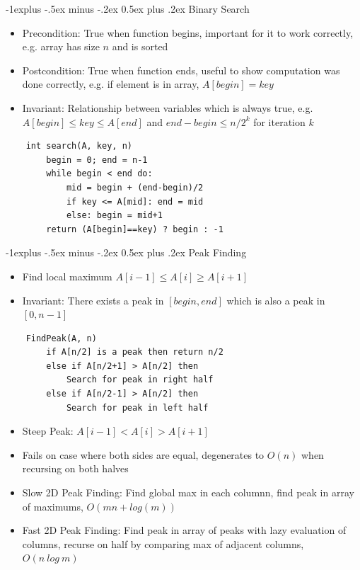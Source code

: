 \documentclass[10pt, landscape]{article}
\makeatletter
\renewcommand{\section}{\@startsection{section}{1}{0mm}%
                                {-1ex plus -.5ex minus -.2ex}%
                                {0.5ex plus .2ex}%
                                {\normalfont\large\bfseries}}
\renewcommand{\section}{\@startsection{section}{2}{0mm}%
                                {-1explus -.5ex minus -.2ex}%
                                {0.5ex plus .2ex}%
                                {\normalfont\normalsize\bfseries}}
\makeatother
\begin{document}
\begin{multicols*}{4}
\section{Binary Search}
\begin{itemize}
    \item Precondition: True when function begins, important for it to work correctly, e.g. array has size $n$ and is sorted
    \item Postcondition: True when function ends, useful to show computation was done correctly, e.g. if element is in array, $A[begin]=key$
    \item Invariant: Relationship between variables which is always true, e.g. $A[begin] \leq key \leq A[end]$ and $end-begin \leq n/2^k$ for iteration $k$
\end{itemize}
\begin{verbatim}
    int search(A, key, n)
        begin = 0; end = n-1
        while begin < end do:
            mid = begin + (end-begin)/2
            if key <= A[mid]: end = mid
            else: begin = mid+1
        return (A[begin]==key) ? begin : -1
\end{verbatim}

\section{Peak Finding}
\begin{itemize}
    \item Find local maximum $A[i-1] \leq A[i] \geq A[i+1]$
    \item Invariant: There exists a peak in $[begin, end]$ which is also a peak in $[0, n-1]$
\end{itemize}
\begin{verbatim}
    FindPeak(A, n)
        if A[n/2] is a peak then return n/2
        else if A[n/2+1] > A[n/2] then
            Search for peak in right half
        else if A[n/2-1] > A[n/2] then
            Search for peak in left half
\end{verbatim}
\begin{itemize}
    \item Steep Peak: $A[i-1] < A[i] > A[i+1]$
    \item Fails on case where both sides are equal, degenerates to $O(n)$ when recursing on both halves
    \item Slow 2D Peak Finding: Find global max in each columnn, find peak in array of maximums, $O(mn+log(m))$
    \item Fast 2D Peak Finding: Find peak in array of peaks with lazy evaluation of columns, recurse on half by comparing max of adjacent columns, $O(n\ log\ m)$
\end{itemize}


\end{multicols*}
\end{document}

